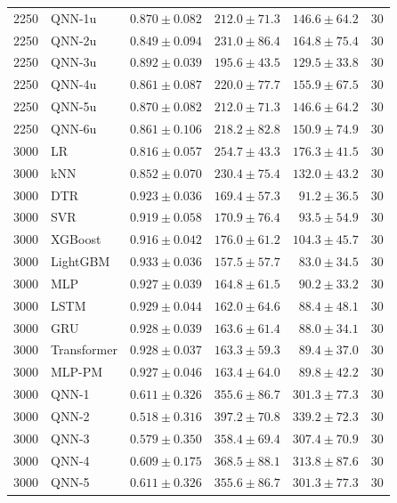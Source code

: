\begin{longtable}{rlrrrr}
2250 & QNN-1u & $0.870 \pm 0.082$ & $212.0 \pm 71.3$ & $146.6 \pm 64.2$ & 30 \\
2250 & QNN-2u & $0.849 \pm 0.094$ & $231.0 \pm 86.4$ & $164.8 \pm 75.4$ & 30 \\
2250 & QNN-3u & $0.892 \pm 0.039$ & $195.6 \pm 43.5$ & $129.5 \pm 33.8$ & 30 \\
2250 & QNN-4u & $0.861 \pm 0.087$ & $220.0 \pm 77.7$ & $155.9 \pm 67.5$ & 30 \\
2250 & QNN-5u & $0.870 \pm 0.082$ & $212.0 \pm 71.3$ & $146.6 \pm 64.2$ & 30 \\
2250 & QNN-6u & $0.861 \pm 0.106$ & $218.2 \pm 82.8$ & $150.9 \pm 74.9$ & 30 \\
\midrule
3000 & LR & $0.816 \pm 0.057$ & $254.7 \pm 43.3$ & $176.3 \pm 41.5$ & 30 \\
3000 & kNN & $0.852 \pm 0.070$ & $230.4 \pm 75.4$ & $132.0 \pm 43.2$ & 30 \\
3000 & DTR & $0.923 \pm 0.036$ & $169.4 \pm 57.3$ & $91.2 \pm 36.5$ & 30 \\
3000 & SVR & $0.919 \pm 0.058$ & $170.9 \pm 76.4$ & $93.5 \pm 54.9$ & 30 \\
3000 & XGBoost & $0.916 \pm 0.042$ & $176.0 \pm 61.2$ & $104.3 \pm 45.7$ & 30 \\
3000 & LightGBM & $0.933 \pm 0.036$ & $157.5 \pm 57.7$ & $83.0 \pm 34.5$ & 30 \\
3000 & MLP & $0.927 \pm 0.039$ & $164.8 \pm 61.5$ & $90.2 \pm 33.2$ & 30 \\
3000 & LSTM & $0.929 \pm 0.044$ & $162.0 \pm 64.6$ & $88.4 \pm 48.1$ & 30 \\
3000 & GRU & $0.928 \pm 0.039$ & $163.6 \pm 61.4$ & $88.0 \pm 34.1$ & 30 \\
3000 & Transformer & $0.928 \pm 0.037$ & $163.3 \pm 59.3$ & $89.4 \pm 37.0$ & 30 \\
3000 & MLP-PM & $0.927 \pm 0.046$ & $163.4 \pm 64.0$ & $89.8 \pm 42.2$ & 30 \\
3000 & QNN-1 & $0.611 \pm 0.326$ & $355.6 \pm 86.7$ & $301.3 \pm 77.3$ & 30 \\
3000 & QNN-2 & $0.518 \pm 0.316$ & $397.2 \pm 70.8$ & $339.2 \pm 72.3$ & 30 \\
3000 & QNN-3 & $0.579 \pm 0.350$ & $358.4 \pm 69.4$ & $307.4 \pm 70.9$ & 30 \\
3000 & QNN-4 & $0.609 \pm 0.175$ & $368.5 \pm 88.1$ & $313.8 \pm 87.6$ & 30 \\
3000 & QNN-5 & $0.611 \pm 0.326$ & $355.6 \pm 86.7$ & $301.3 \pm 77.3$ & 30 \\

\end{longtable}

